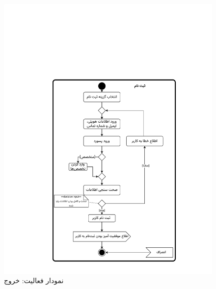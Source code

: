 \begin{figure}[ht!]
	\centering
	\includegraphics[scale=0.8, page=3]{figs/OOD-activity1-10.pdf}
	\caption{نمودار فعالیت: خروج}
\end{figure}
\FloatBarrier
\newpage

